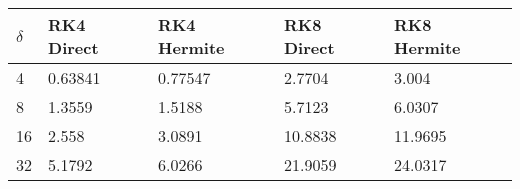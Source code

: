 \begin{tabular}{lllll}
$\delta$ & RK4 Direct & RK4 Hermite & RK8 Direct & RK8 Hermite \\ 
\hline 
4 & 0.63841 & 0.77547 & 2.7704 & 3.004 \\ 
8 & 1.3559 & 1.5188 & 5.7123 & 6.0307 \\ 
16 & 2.558 & 3.0891 & 10.8838 & 11.9695 \\ 
32 & 5.1792 & 6.0266 & 21.9059 & 24.0317 \\ 
\hline 
\end{tabular}